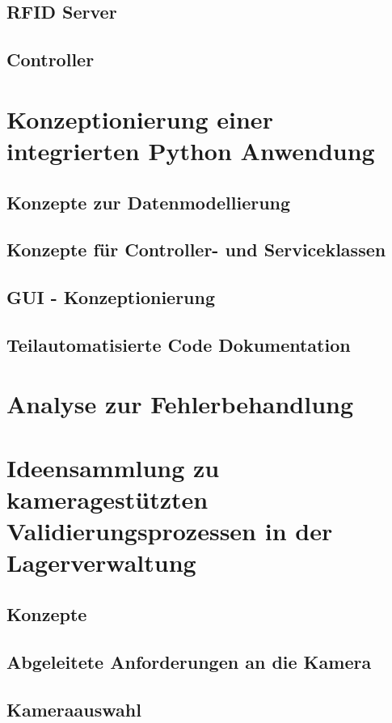 \documentclass[11pt]{scrartcl}
\begin{document}
    \subsection {RFID Server}

    \subsection {Controller}

    \newpage
    \section {Konzeptionierung einer integrierten Python Anwendung}

    \subsection {Konzepte zur Datenmodellierung}

    \subsection {Konzepte für Controller- und Serviceklassen}

    \subsection {GUI - Konzeptionierung}

    \subsection {Teilautomatisierte Code Dokumentation}

    \newpage
    \section{Analyse zur Fehlerbehandlung}

    \newpage
    \section {Ideensammlung zu kameragestützten Validierungsprozessen in der Lagerverwaltung}

    \subsection {Konzepte}

    \subsection {Abgeleitete Anforderungen an die Kamera}

    \subsection {Kameraauswahl}
\end{document}
